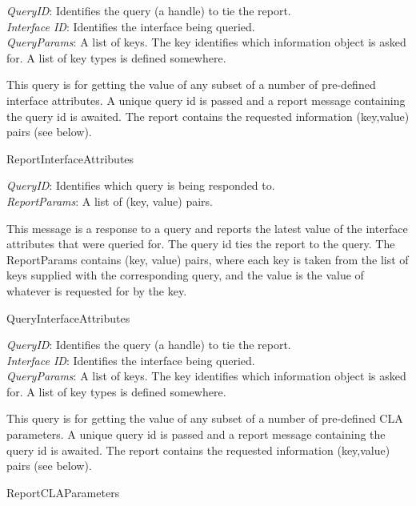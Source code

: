 {
\metP
    {\em QueryID}: Identifies the query (a handle) to tie the report.\\
    {\em Interface ID}: Identifies the interface being queried.\\
    {\em QueryParams}: A list of keys. The key identifies which information
    object is asked for. A list of key types is defined somewhere.

\metD
    This query is for getting the value of any subset of a number of
    pre-defined interface attributes. A unique query id is passed and a
    report message containing the query id is awaited. The report contains
    the requested information (key,value) pairs (see below).

\metR
    ReportInterfaceAttributes
}

{
\metP
    {\em QueryID}: Identifies which query is being responded to.\\
    {\em ReportParams}: A list of (key, value) pairs.
    
\metD
    This message is a response to a query and reports the latest value
    of the interface attributes that were queried for. The query id ties
    the report to the query. The ReportParams contains (key, value)
    pairs, where each key is taken from the list of keys supplied with
    the corresponding query, and the value is the value of whatever is
    requested for by the key.

\metR
    QueryInterfaceAttributes
}

{
\metP
    {\em QueryID}: Identifies the query (a handle) to tie the report.\\
    {\em Interface ID}: Identifies the interface being queried.\\
    {\em QueryParams}: A list of keys. The key identifies which information
    object is asked for. A list of key types is defined somewhere.
    
\metD
    This query is for getting the value of any subset of a number of
    pre-defined CLA parameters. A unique query id is passed and a
    report message containing the query id is awaited. The report contains
    the requested information (key,value) pairs (see below).

\metR
    ReportCLAParameters
}

